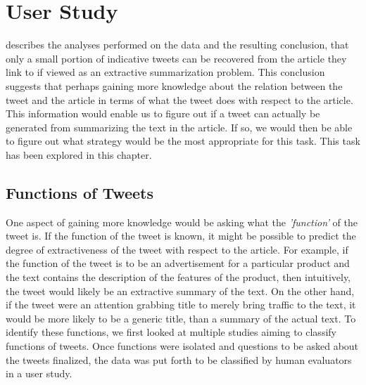 \chapter{User Study}
\label{chap:user}

 describes the analyses performed on the data and the resulting conclusion, that only a small portion of indicative tweets can be recovered from the article they link to if viewed as an extractive summarization problem. This conclusion suggests that perhaps gaining more knowledge about the relation between the tweet and the article in terms of what the tweet does with respect to the article. This information would enable us to figure out if a tweet can actually be generated from summarizing the text in the article. If so, we would then be able to figure out what strategy would be the most appropriate for this task. This task has been explored in this chapter. 

\section{Functions of Tweets}
One aspect of gaining more knowledge would be asking what the \textit{'function'} of the tweet is. If the function of the tweet is known, it might be possible to predict the degree of extractiveness of the tweet with respect to the article. For example, if the function of the tweet is to be an advertisement for a particular product and the text contains the description of the features of the product, then intuitively, the tweet would likely be an extractive summary of the text. On the other hand, if the tweet were an attention grabbing title to merely bring traffic to the text, it would be more likely to be a generic title, than a summary of the actual text. To identify these functions, we first looked at multiple studies aiming to classify functions of tweets. Once functions were isolated and questions to be asked about the tweets finalized, the data was put forth to be classified by human evaluators in a user study.

